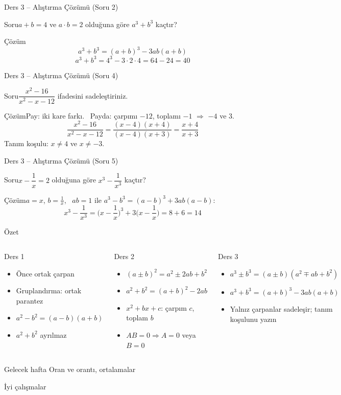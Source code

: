 \documentclass[aspectratio=169,11pt,handout]{beamer}
\newcommand{\soru}[3]{%
\begin{frame}{#1}
  \begin{block}{Soru}\large #2\end{block}
  \pause
  \begin{exampleblock}{Çözüm}\large #3\end{exampleblock}
\end{frame}}
\begin{document}
\soru{Ders 3 -- Alıştırma Çözümü (Soru 2)}
{\(a+b=4\) ve \(a\cdot b=2\) olduğuna göre \(a^3+b^3\) kaçtır?}
{\[a^3+b^3=(a+b)^3-3ab(a+b)\]
\[a^3+b^3=4^3-3\cdot 2\cdot 4=64-24=40\]}

\soru{Ders 3 -- Alıştırma Çözümü (Soru 4)}
{\(\dfrac{x^2-16}{x^2-x-12}\) ifadesini sadeleştiriniz.}
{Pay: iki kare farkı. \ Payda: çarpımı \(-12\), toplamı \(-1\) \(\Rightarrow\) \(-4\) ve \(3\).
\[\frac{x^2-16}{x^2-x-12}=\frac{(x-4)(x+4)}{(x-4)(x+3)}=\frac{x+4}{x+3}\]
Tanım koşulu: \(x\neq 4\) ve \(x\neq -3\).}

\soru{Ders 3 -- Alıştırma Çözümü (Soru 5)}
{\(x-\dfrac{1}{x}=2\) olduğuna göre \(x^3-\dfrac{1}{x^3}\) kaçtır?}
{\(a=x\), \(b=\frac{1}{x}\), \ \(ab=1\) ile \(a^3-b^3=(a-b)^3+3ab(a-b)\):
\[x^3-\frac{1}{x^3}=\Big(x-\frac{1}{x}\Big)^3+3\Big(x-\frac{1}{x}\Big)=8+6=14\]}


\begin{frame}{Özet}
\begin{columns}[t]
\begin{block}{Ders 1}
\begin{itemize}
\item Önce ortak çarpan
\item Gruplandırma: ortak parantez
\item \(a^2-b^2=(a-b)(a+b)\)
\item \(a^2+b^2\) ayrılmaz
\end{itemize}
\end{block}
\begin{block}{Ders 2}
\begin{itemize}
\item \((a\pm b)^2=a^2\pm 2ab+b^2\)
\item \(a^2+b^2=(a+b)^2-2ab\)
\item \(x^2+bx+c\): çarpım \(c\), toplam \(b\)
\item \(AB=0\Rightarrow A=0\) veya \(B=0\)
\end{itemize}
\end{block}
\begin{block}{Ders 3}
\begin{itemize}
\item \(a^3\pm b^3=(a\pm b)(a^2\mp ab+b^2)\)
\item \(a^3+b^3=(a+b)^3-3ab(a+b)\)
\item Yalnız çarpanlar sadeleşir; tanım koşulunu yazın
\end{itemize}
\end{block}
\end{columns}
\vspace{6pt}
\begin{alertblock}{Gelecek hafta}
Oran ve orantı, ortalamalar
\end{alertblock}
\end{frame}

\begin{frame}
\centering\Large İyi çalışmalar
\end{frame}
\end{document}
